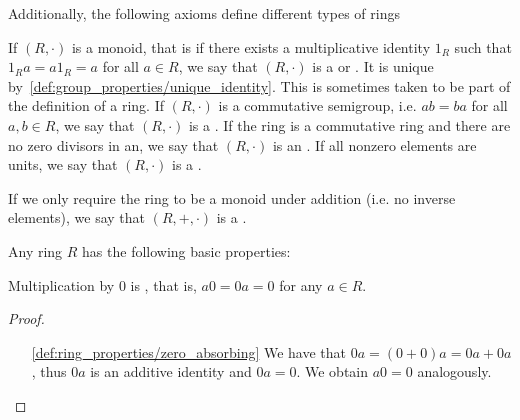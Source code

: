 \begin{definition}
  Additionally, the following axioms define different types of rings
  \begin{description}
     If \( (R, \cdot) \) is a monoid, that is if there exists a multiplicative identity \( 1_R \) such that \( 1_R a = a1_R = a \) for all \( a \in R \), we say that \( (R, \cdot) \) is a  or . It is unique by~\cref{def:group_properties/unique_identity}. This is sometimes taken to be part of the definition of a ring.
     If \( (R, \cdot) \) is a commutative semigroup, i.e. \( ab = ba \) for all \( a, b \in R \), we say that \( (R, \cdot) \) is a .
     If the ring is a commutative ring and there are no zero divisors in an, we say that \( (R, \cdot) \) is an .
     If all nonzero elements are units, we say that \( (R, \cdot) \) is a .
  \end{description}

  If we only require the ring to be a monoid under addition (i.e. no inverse elements), we say that \( (R, +, \cdot) \) is a .
\end{definition}

\begin{proposition}\label{def:ring_properties}
  Any ring \( R \) has the following basic properties:
  \begin{defenum}
    \item\label{def:ring_properties/zero_absorbing} Multiplication by \( 0 \) is , that is, \( a0 = 0a = 0 \) for any \( a \in R \).
  \end{defenum}
\end{proposition}
\begin{proof}\mbox{}
  \begin{itemize}
    \item[\ref{def:ring_properties/zero_absorbing}] We have that \( 0a = (0 + 0)a = 0a + 0a \), thus \( 0a \) is an additive identity and \( 0a = 0 \). We obtain \( a0 = 0 \) analogously.
  \end{itemize}
\end{proof}

